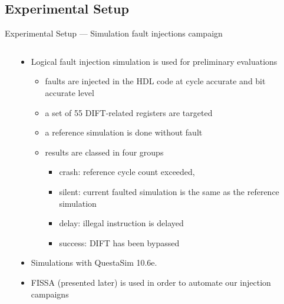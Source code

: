\subsection{Experimental Setup}
\begin{frame}{Experimental Setup — Simulation fault injections campaign}
    \begin{columns}
        \begin{column}{.125\linewidth}
            \hfill
        \end{column}
        \begin{column}{.75\linewidth}
            \begin{itemize}
                \justifying
                \item Logical fault injection simulation is used for preliminary evaluations
                      \begin{itemize}
                          \justifying
                          \item faults are injected in the HDL code at cycle accurate and bit accurate level
                          \item a set of 55 DIFT-related registers are targeted
                          \item a reference simulation is done without fault
                          \item results are classed in four groups
                                \begin{itemize}
                                    \justifying
                                    \item crash: reference cycle count exceeded,
                                    \item silent: current faulted simulation is the same as the reference simulation
                                    \item delay: illegal instruction is delayed
                                    \item success: DIFT has been bypassed
                                \end{itemize}
                      \end{itemize}
                \item Simulations with QuestaSim 10.6e.
                \item FISSA (presented later) is used in order to automate our injection campaigns
            \end{itemize}
        \end{column}
        \begin{column}{.125\linewidth}
            \hfill
        \end{column}
    \end{columns}
\end{frame}
